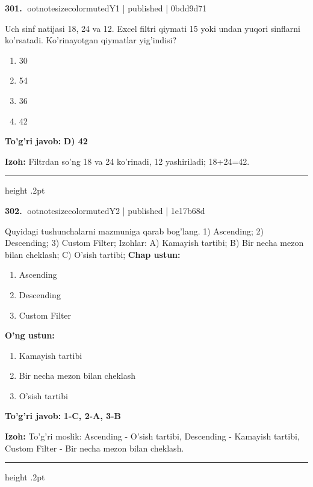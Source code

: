 \documentclass[10pt,a4paper]{article}
\begin{document}
\textbf{\color{ink}301.} {ootnotesizecolor{muted}Y1 | published | 0bdd9d71}
\par
Uch sinf natijasi 18, 24 va 12. Excel filtri qiymati 15 yoki undan yuqori sinflarni ko'rsatadi. Ko'rinayotgan qiymatlar yig'indisi?
\begin{enumerate}[label=\Alph*),leftmargin=9mm]
\item 30
\item 54
\item 36
\item 42
\end{enumerate}
\begin{tcolorbox}[enhanced,breakable,colback=teal!4,colframe=teal!55!black,boxrule=0.45pt,arc=1.2mm,left=2.8mm,right=2.8mm,top=2mm,bottom=2mm]
\textbf{\color{teal}To'g'ri javob:} \textbf{D) 42}
\par\smallskip
\textbf{Izoh:} Filtrdan so'ng 18 va 24 ko'rinadi, 12 yashiriladi; 18+24=42.
\end{tcolorbox}
\vspace{2mm}\hrule height .2pt\vspace{2mm}

\textbf{\color{ink}302.} {ootnotesizecolor{muted}Y2 | published | 1e17b68d}
\par
Quyidagi tushunchalarni mazmuniga qarab bog'lang.  1) Ascending;  2) Descending;  3) Custom Filter;  Izohlar: A) Kamayish tartibi;  B) Bir necha mezon bilan cheklash;  C) O'sish tartibi;
\textbf{Chap ustun:}\begin{enumerate}[label=\arabic*),leftmargin=9mm]
\item Ascending
\item Descending
\item Custom Filter
\end{enumerate}
\textbf{O'ng ustun:}\begin{enumerate}[label=\Alph*),leftmargin=9mm]
\item Kamayish tartibi
\item Bir necha mezon bilan cheklash
\item O'sish tartibi
\end{enumerate}
\begin{tcolorbox}[enhanced,breakable,colback=teal!4,colframe=teal!55!black,boxrule=0.45pt,arc=1.2mm,left=2.8mm,right=2.8mm,top=2mm,bottom=2mm]
\textbf{\color{teal}To'g'ri javob:} \textbf{1-C, 2-A, 3-B}
\par\smallskip
\textbf{Izoh:} To'g'ri moslik: Ascending - O'sish tartibi, Descending - Kamayish tartibi, Custom Filter - Bir necha mezon bilan cheklash.
\end{tcolorbox}
\vspace{2mm}\hrule height .2pt\vspace{2mm}
\end{document}
